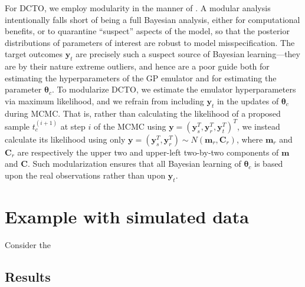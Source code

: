 \documentclass[12pt]{article}
\begin{document}
For DCTO, we employ modularity in the manner of \cite{Liu2009}. 
%
A modular analysis intentionally falls short of being a full Bayesian analysis, either for computational benefits, or to quarantine ``suspect'' aspects of the model, so that the posterior distributions of parameters of interest are robust to model misspecification.
%
The target outcomes $\mathbf y_t$ are precisely such a suspect source of Bayesian learning---they are by their nature extreme outliers, and hence are a poor guide both for estimating the hyperparameters of the GP emulator and for estimating the parameter $\boldsymbol\theta_c$.
%
To modularize DCTO, we estimate the emulator hyperparameters via maximum likelihood, and we refrain from including $\mathbf y_t$ in the updates of $\boldsymbol\theta_c$ during MCMC.
%
That is, rather than calculating the likelihood of a proposed sample $t_c^{(i+1)}$ at step $i$ of the MCMC using $\mathbf y = (\mathbf y_s^T, \mathbf y_r^T, \mathbf y_t^T)^T$, we instead calculate its likelihood using only $\mathbf y = (\mathbf y_s^T, \mathbf y_r^T)\sim N(\mathbf m_r,\mathbf C_r)$, where $\mathbf m_r$ and $\mathbf C_r$ are respectively the upper two and upper-left two-by-two components of $\mathbf m$ and $\mathbf C$.
%
Such modularization ensures that all Bayesian learning of $\boldsymbol\theta_c$ is based upon the real observations rather than upon $\mathbf y_t$.
%

%
\section{Example with simulated data}\label{sec:example}
%
Consider the 

%
\subsection{Results}
\end{document}
